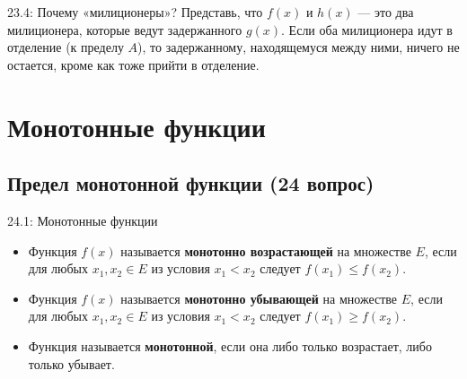 \documentclass[a4paper,12pt]{article}
\begin{document}
	\begin{notebook}{23.4: Почему «милиционеры»?}
		Представь, что $f(x)$ и $h(x)$ — это два милиционера, которые ведут задержанного $g(x)$. Если оба милиционера идут в отделение (к пределу $A$), то задержанному, находящемуся между ними, ничего не остается, кроме как тоже прийти в отделение.
	\end{notebook}
	
	
	
	
	
	\newpage
	\section{Монотонные функции}
	
	\subsection{Предел монотонной функции (24 вопрос)}
	
	\begin{definitionbox}{24.1: Монотонные функции}
		\begin{itemize}
			\item Функция $f(x)$ называется \textbf{монотонно возрастающей} на множестве $E$, если для любых $x_1, x_2 \in E$ из условия $x_1 < x_2$ следует $f(x_1) \le f(x_2)$.
			\item Функция $f(x)$ называется \textbf{монотонно убывающей} на множестве $E$, если для любых $x_1, x_2 \in E$ из условия $x_1 < x_2$ следует $f(x_1) \ge f(x_2)$.
			\item Функция называется \textbf{монотонной}, если она либо только возрастает, либо только убывает.
		\end{itemize}
	\end{definitionbox}
	
\end{document}
